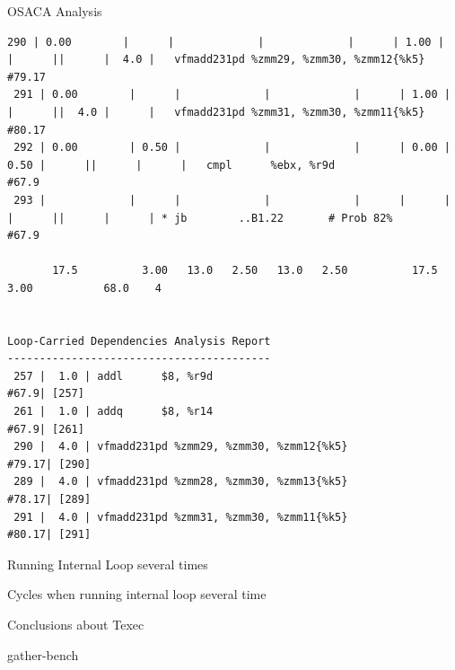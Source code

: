\documentclass[aspectratio=43,t]{beamer}
\begin{document}
\begin{frame}[fragile]{OSACA Analysis}
\begin{lstlisting}[basicstyle=\tt\tiny]
 290 | 0.00        |      |             |             |      | 1.00 |      |      ||      |  4.0 |   vfmadd231pd %zmm29, %zmm30, %zmm12{%k5}                 #79.17
 291 | 0.00        |      |             |             |      | 1.00 |      |      ||  4.0 |      |   vfmadd231pd %zmm31, %zmm30, %zmm11{%k5}                 #80.17
 292 | 0.00        | 0.50 |             |             |      | 0.00 | 0.50 |      ||      |      |   cmpl      %ebx, %r9d                                    #67.9
 293 |             |      |             |             |      |      |      |      ||      |      | * jb        ..B1.22       # Prob 82%                      #67.9

       17.5          3.00   13.0   2.50   13.0   2.50          17.5   3.00           68.0    4   


Loop-Carried Dependencies Analysis Report
-----------------------------------------
 257 |  1.0 | addl      $8, %r9d                                      #67.9| [257]
 261 |  1.0 | addq      $8, %r14                                      #67.9| [261]
 290 |  4.0 | vfmadd231pd %zmm29, %zmm30, %zmm12{%k5}                 #79.17| [290]
 289 |  4.0 | vfmadd231pd %zmm28, %zmm30, %zmm13{%k5}                 #78.17| [289]
 291 |  4.0 | vfmadd231pd %zmm31, %zmm30, %zmm11{%k5}                 #80.17| [291]
    \end{lstlisting}
  \end{frame}

  \begin{frame}[fragile]{Running Internal Loop several times}
  \end{frame}

  \begin{frame}[fragile]{Cycles when running internal loop several time}
  \end{frame}

  \begin{frame}[fragile]{Conclusions about Texec}
  \end{frame}

  \begin{frame}[fragile]{gather-bench}
  \end{frame}

\end{document}
